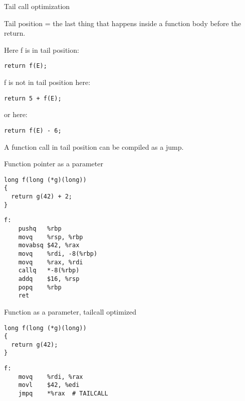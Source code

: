 \documentclass[landscape]{beamer}
\begin{document}
\begin{frame}[fragile]{Tail call optimization}

Tail position = the last thing that happens inside a function body before the return.


Here f is in tail position:
\begin{verbatim}
return f(E);
\end{verbatim}
f is not in tail position here:
\begin{verbatim}
return 5 + f(E);
\end{verbatim}
or here:
\begin{verbatim}
return f(E) - 6;
\end{verbatim}
A function call in tail position can be compiled as a jump.

\end{frame}



\begin{frame}[fragile]{Function pointer as a parameter}
\begin{minipage}{.5\textwidth}
\begin{verbatim}
long f(long (*g)(long))
{
  return g(42) + 2;
}
\end{verbatim}
\end{minipage}
%
\begin{minipage}{.4\textwidth}
\begin{verbatim}
f:                   
	pushq	%rbp
	movq	%rsp, %rbp
	movabsq	$42, %rax
	movq	%rdi, -8(%rbp)
	movq	%rax, %rdi
	callq	*-8(%rbp)
	addq	$16, %rsp
	popq	%rbp
	ret
\end{verbatim}
\end{minipage}
\vspace{3em}

\end{frame}



\begin{frame}[fragile]{Function as a parameter, tailcall optimized}
\begin{minipage}{.45\textwidth}
\begin{verbatim}
long f(long (*g)(long))
{
  return g(42);
}
\end{verbatim}
\end{minipage}
%
\begin{minipage}{.5\textwidth}
\begin{verbatim}
f:                              
	movq	%rdi, %rax
	movl	$42, %edi
	jmpq	*%rax  # TAILCALL
\end{verbatim}
\end{minipage}
\end{frame}
\end{document}
